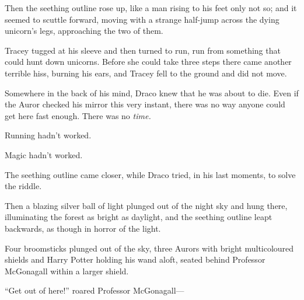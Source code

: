 Then the seething outline rose up, like a man rising to his feet only not so; and it seemed to scuttle forward, moving with a strange half-jump across the dying unicorn’s legs, approaching the two of them.

Tracey tugged at his sleeve and then turned to run, run from something that could hunt down unicorns. Before she could take three steps there came another terrible hiss, burning his ears, and Tracey fell to the ground and did not move.

Somewhere in the back of his mind, Draco knew that he was about to die. Even if the Auror checked his mirror this very instant, there was no way anyone could get here fast enough. There was no \emph{time.}

Running hadn’t worked.

Magic hadn’t worked.

The seething outline came closer, while Draco tried, in his last moments, to solve the riddle.

Then a blazing silver ball of light plunged out of the night sky and hung there, illuminating the forest as bright as daylight, and the seething outline leapt backwards, as though in horror of the light.

Four broomsticks plunged out of the sky, three Aurors with bright multicoloured shields and Harry Potter holding his wand aloft, seated behind Professor McGonagall within a larger shield.

“Get out of here!” roared Professor McGonagall—

